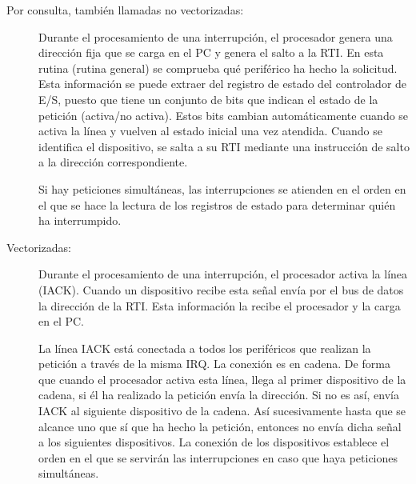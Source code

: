 \begin{description}
	\item [Por consulta, también llamadas no vectorizadas:] Durante el procesamiento de una interrupción, el procesador genera una dirección fija que se carga en el PC y genera el salto a la RTI. En esta rutina (rutina general) se comprueba qué periférico ha hecho la solicitud.  Esta información se puede extraer del registro de estado del controlador de E/S, puesto que tiene un conjunto de bits que indican el estado de la petición (activa/no activa).  Estos bits cambian automáticamente cuando se activa la línea y vuelven al estado inicial una vez atendida.  Cuando se identifica el dispositivo, se salta a su RTI mediante una instrucción de salto a la dirección correspondiente.
	
	Si hay peticiones simultáneas, las interrupciones se atienden en el orden en el que se hace la lectura de los registros de estado para determinar qui\'en ha interrumpido. 
	\item [Vectorizadas:] Durante el procesamiento de una interrupción, el procesador activa la línea (IACK). Cuando un dispositivo  recibe esta señal envía por el bus de datos la dirección  de la RTI. Esta información la recibe el procesador y la  carga en el PC.
	
	La línea  IACK está conectada  a todos los periféricos que realizan la petición a través de la misma IRQ. La conexión es en cadena. De forma que cuando el procesador activa esta línea, llega al primer dispositivo de la cadena, si él ha realizado la petición envía la dirección. Si no es así, envía IACK al siguiente dispositivo de la cadena. Así sucesivamente hasta que se alcance uno que sí que ha hecho la petición, entonces no envía dicha señal a los siguientes dispositivos. La conexión de los dispositivos establece el orden en el que se servirán las interrupciones en caso que haya peticiones simultáneas.
\end{description}

